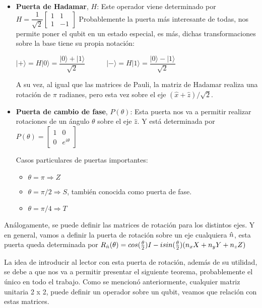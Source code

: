 \begin{itemize}
    \item \textbf{Puerta de Hadamar}, $H$: Este operador viene determinado por $H = \dfrac{1}{\sqrt{2}} \begin{bmatrix} 1 & 1\\1 & -1 \end{bmatrix}$
    Probablemente la puerta más interesante de todas, nos permite poner el qubit en un estado especial, es más, dichas transformaciones sobre la base tiene su propia notación:

    \begin{center}
        
    $|+\rangle = H|0\rangle = \dfrac{|0\rangle + |1\rangle}{\sqrt{2}} \quad \quad \quad |-\rangle = H |1\rangle = \dfrac{|0\rangle - |1\rangle}{\sqrt{2}}$\end{center}

    A su vez, al igual que las matrices de Pauli, la matriz de Hadamar realiza una rotación de $\pi$ radianes, pero esta vez sobre el eje $(\hat{x} + \hat{z}) / \sqrt{2}$.
     
    \item \textbf{Puerta de cambio de fase}, $P(\theta)$: Esta puerta nos va a permitir realizar rotaciones de un ángulo $\theta$ sobre el eje $\hat{z}$. Y está determinada por $P(\theta) = \begin{bmatrix}1 & 0\\0 & e^{i\theta} \end{bmatrix}$

    Casos particulares de puertas importantes:
    \begin{itemize}
        \item $\theta = \pi \Rightarrow Z$
        \item $\theta = \pi/2 \Rightarrow S$, también conocida como puerta de fase.
        \item $\theta = \pi/4 \Rightarrow T$
    \end{itemize}
 \end{itemize}

 Análogamente, se puede definir las matrices de rotación para los distintos ejes. Y en general, vamos a definir la puerta de rotación sobre un eje cualquiera $\Hat{n}$, esta puerta queda determinada por $R_{\Hat{n}}(\theta) = cos (\frac{\theta}{2})I - i sin(\frac{\theta}{2})(n_{x}X + n_{y}Y + n_{z}Z) $ \newline

 La idea de introducir al lector con esta puerta de rotación, además de su utilidad, se debe a que nos va a permitir presentar el siguiente teorema, probablemente el único en todo el trabajo. Como se mencionó anteriormente, cualquier matriz unitaria 2 x 2, puede definir un operador sobre un qubit, veamos que relación con estas matrices. \newline
 

